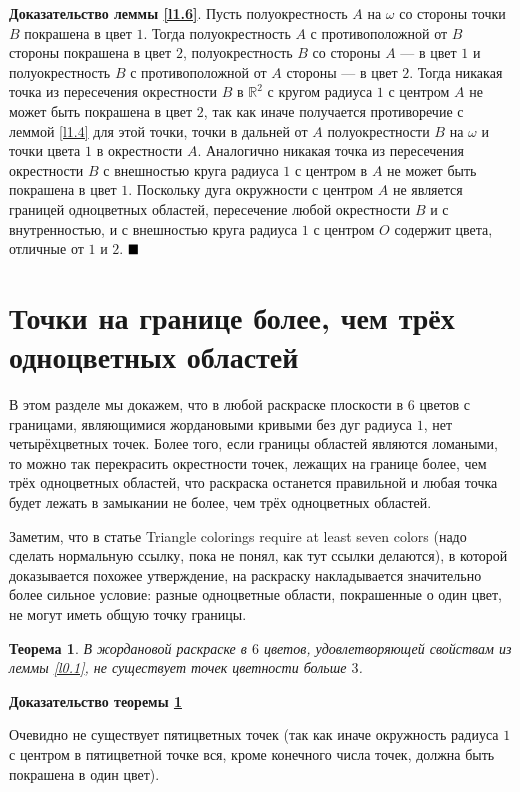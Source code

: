\documentclass[12pt,a4paper]{article}
\newtheorem{theorem}{Теорема}
\renewcommand{\qed}{$\blacksquare \vspace{5mm}$}
\begin{document}
\textbf{Доказательство леммы \ref{l1.6}}.
Пусть полуокрестность $A$ на $\omega$ со стороны точки $B$ покрашена в цвет $1$. Тогда полуокрестность $A$ с противоположной от $B$ стороны покрашена в цвет $2$, полуокрестность $B$ со стороны $A$ --- в цвет $1$ и полуокрестность $B$ с противоположной от $A$ стороны --- в цвет $2$. Тогда никакая точка из пересечения окрестности $B$ в $\mathbb{R}^2$ с кругом радиуса $1$ с центром $A$ не может быть покрашена в цвет $2$, так как иначе получается противоречие с леммой \ref{l1.4} для этой точки, точки в дальней от $A$ полуокрестности $B$ на $\omega$ и точки цвета $1$ в окрестности $A$. Аналогично никакая точка из пересечения окрестности $B$ с внешностью круга радиуса $1$ с центром в $A$ не может быть покрашена в цвет $1$. Поскольку дуга окружности с центром $A$ не является границей одноцветных областей, пересечение любой окрестности $B$ и с внутренностью, и с внешностью круга радиуса $1$ с центром $O$ содержит цвета, отличные от $1$ и $2$. \qed

\section{Точки на границе более, чем трёх одноцветных областей}

В этом разделе мы докажем, что в любой раскраске плоскости в $6$ цветов с границами, являющимися жордановыми кривыми без дуг радиуса $1$, нет четырёхцветных точек. Более того, если границы областей являются ломаными, то можно так перекрасить окрестности точек, лежащих на границе более, чем трёх одноцветных областей, что раскраска останется правильной и любая точка будет лежать в замыкании не более, чем трёх одноцветных областей.

Заметим, что в статье Triangle colorings require at least seven colors (надо сделать нормальную ссылку, пока не понял, как тут ссылки делаются), в которой доказывается похожее утверждение, на раскраску накладывается значительно более сильное условие: разные одноцветные области, покрашенные о один цвет, не могут иметь общую точку границы.

\begin{theorem} \label{t3}
	В жордановой раскраске в $6$ цветов, удовлетворяющей свойствам из леммы \ref{l0.1}, не существует точек цветности больше $3$. 
\end{theorem}

\textbf{Доказательство теоремы \ref{t3}}

Очевидно не существует пятицветных точек (так как иначе окружность радиуса $1$ с центром в пятицветной точке вся, кроме конечного числа точек, должна быть покрашена в один цвет).
\end{document}
